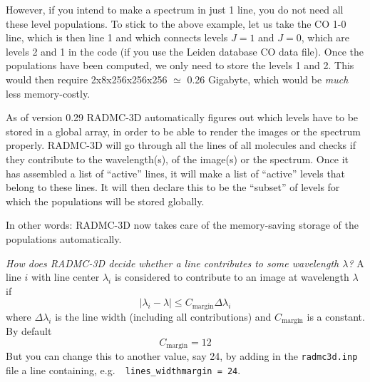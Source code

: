 \documentclass{report}
\begin{document}
However, if you intend to make a spectrum in just 1 line, you do not need
all these level populations. To stick to the above example, let us take the
CO 1-0 line, which is then line 1 and which connects levels $J=1$ and $J=0$,
which are levels 2 and 1 in the code (if you use the Leiden database CO data
file).  Once the populations have been computed, we only need to store the
levels 1 and 2. This would then require 2x8x256x256x256 $\simeq$ 0.26
Gigabyte, which would be {\em much} less memory-costly.

As of version 0.29 RADMC-3D automatically figures out which levels have to
be stored in a global array, in order to be able to render the images or the
spectrum properly. RADMC-3D will go through all the lines of all molecules
and checks if they contribute to the wavelength(s), of the image(s) or the
spectrum. Once it has assembled a list of ``active'' lines, it will make a
list of ``active'' levels that belong to these lines. It will then declare
this to be the ``subset'' of levels for which the populations will be stored
globally.

In other words: RADMC-3D now takes care of the memory-saving storage of
the populations automatically.

{\em How does RADMC-3D decide whether a line contributes to some wavelength
  $\lambda$?} A line $i$ with line center $\lambda_i$ is considered to
contribute to an image at wavelength $\lambda$ if 
\begin{equation}
| \lambda_i-\lambda | \le C_{\mathrm{margin}}\Delta\lambda_i
\end{equation}
where $\Delta\lambda_i$ is the line width (including all contributions) and
$C_{\mathrm{margin}}$ is a constant. By default
\begin{equation}
C_{\mathrm{margin}} = 12
\end{equation}
But you can change this to another value, say 24, by adding in the
{\small\tt radmc3d.inp} file a line containing, e.g.\ {\small\tt
  lines\_widthmargin = 24}.
\end{document}
